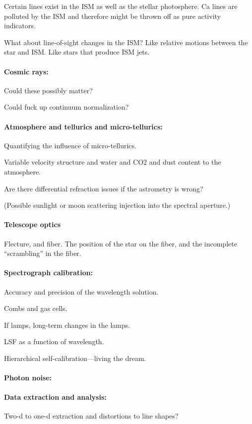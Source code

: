 \documentclass[12pt, fullpage, letterpaper]{article}
\begin{document}
Certain lines exist in the ISM as well as the stellar photosphere. Ca
lines are polluted by the ISM and therefore might be thrown off as
pure activity indicators.

What about line-of-sight changes in the ISM? Like relative motions
between the star and ISM. Like stars that produce ISM jets.

\paragraph{Cosmic rays:}
Could these possibly matter?

Could fuck up continuum normalization?

\paragraph{Atmosphere and tellurics and micro-tellurics:}
Quantifying the influence of micro-tellurics.

Variable velocity structure and water and CO2 and dust content to the atmosphere.

Are there differential refraction issues if the astrometry is wrong?

(Possible sunlight or moon scattering injection into the spectral aperture.)

\paragraph{Telescope optics}
Flecture, and fiber. The position of the star on the fiber, and the
incomplete ``scrambling'' in the fiber.

\paragraph{Spectrograph calibration:}
Accuracy and precision of the wavelength solution.

Combs and gas cells.

If lamps, long-term changes in the lamps.

LSF as a function of wavelength.

Hierarchical self-calibration---living the dream.

\paragraph{Photon noise:}

\paragraph{Data extraction and analysis:}
Two-d to one-d extraction and distortions to line shapes?
\end{document}
